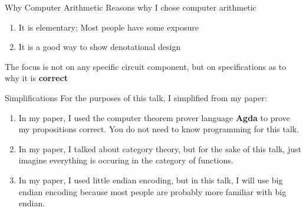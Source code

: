 \documentclass[aspectratio=169]{beamer}
\begin{document}
\begin{frame}{Why Computer Arithmetic}
  Reasons why I chose computer arithmetic
  \begin{enumerate}
          \pause \item It is elementary; Most people have some exposure
          \pause \item It is a good way to show denotational design
    \end{enumerate}
    \pause The focus is not on any specific circuit component, but on specifications as to why it is \textbf{correct}
\end{frame}

\begin{frame}{Simplifications}
  For the purposes of this talk, I simplified from my paper:
  \begin{enumerate}
          \pause \item In my paper, I used the computer theorem prover language \textbf{Agda} to prove my propositions correct. You do not need to know programming for this talk.
          \pause \item In my paper, I talked about category theory, but for the sake of this talk, just imagine everything is occuring in the category of functions.
          \pause \item In my paper, I used little endian encoding, but in this talk, I will use big endian encoding because most people are probably more familiar with big endian.
        \end{enumerate}
\end{frame}
\end{document}
